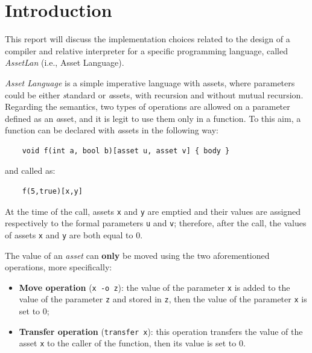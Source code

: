 \documentclass[11pt]{article} %
\begin{document}
\clearpage
\tableofcontents
\thispagestyle{empty}
\newpage

\section{Introduction}
This report will discuss the implementation choices related to the design of a compiler and relative interpreter for a specific programming language, called \emph{AssetLan} (i.e., Asset Language). 

\medskip

\emph{Asset Language} is a simple imperative language with assets, where parameters could be either {\emph standard} or {\emph assets}, with recursion and without mutual recursion. Regarding the semantics, two types of operations are allowed on a parameter defined as an {\emph asset}, and it is legit to use them only in a function. To this aim, a function can be declared  with {\emph assets} in the following way:
\begin{verbatim}
    void f(int a, bool b)[asset u, asset v] { body }
\end{verbatim} 
and called as: 
\begin{verbatim}
    f(5,true)[x,y]
\end{verbatim}
At the time of the call, assets \verb|x| and \verb|y| are emptied and their values are assigned respectively to the formal parameters \verb|u| and \verb|v|; therefore, after the call, the values of assets \verb|x| and \verb|y| are both equal to 0.

\medskip

The value of an \emph{asset} can \textbf{only} be moved using the two aforementioned operations, more specifically: 
\begin{itemize}
\item \textbf{Move operation} (\verb|x -o z|): the value of the parameter \verb|x| is added to the value of the parameter \verb|z| and stored in \verb|z|, then the value of the parameter \verb|x| is set to 0;
\item \textbf{Transfer operation} (\verb|transfer x|): this operation transfers the value of the asset \verb|x| to the caller of the function, then its value is set to 0.
\end{itemize}
\end{document}
